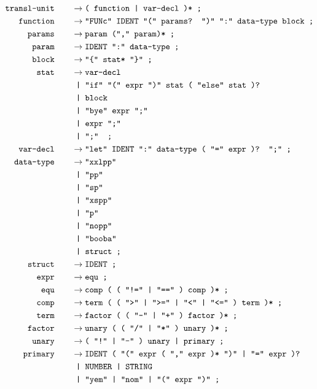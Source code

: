 \documentclass[12pt, a4paper]{article}
\newcommand{\ttt}[1]{
    \text{\texttt{#1}}
}
\newcommand{\ebnfnode}[2]{%
    #1\hspace{20px} &\to #2\ttt{ ;}\\
}
\newcommand{\ebnfnodett}[2]{%
    \ebnfnode{\ttt{#1}}{\ttt{#2}}
}
\begin{document}
    \begin{align*}
        \ebnfnodett{transl-unit}{( function | var-decl )*}
        \ebnfnodett{function}{"FUNc" IDENT "(" params? ")" ":" data-type block}
        \ebnfnodett{params}{param ("," param)*}
        \ebnfnodett{param}{IDENT ":" data-type}
        \ebnfnodett{block}{"\{" stat* "\}"}
        \ebnfnode{\ttt{stat}}
        {%
            \ttt{var-decl}\\
            &\ttt{ | "if" "(" expr ")" stat ( "else" stat )?}\\
            &\ttt{ | block }\\
            &\ttt{ | "bye" expr ";" }\\
            &\ttt{ | expr ";" }\\
            &\ttt{ | ";" }
        }
        \ebnfnodett{var-decl}{"let" IDENT ":" data-type ( "=" expr )? ";"}
        \ebnfnode{\ttt{data-type}}
        {%
            \ttt{"xxlpp"}\\
            &\ttt{ | "pp"}\\
            &\ttt{ | "sp"}\\
            &\ttt{ | "xspp"}\\
            &\ttt{ | "p"}\\
            &\ttt{ | "nopp"}\\
            &\ttt{ | "booba"}\\
            &\ttt{ | struct}
        }
        \ebnfnodett{struct}{IDENT}
        \ebnfnodett{expr}{equ}
        \ebnfnodett{equ}{comp ( ( "!=" | "==" ) comp )*}
        \ebnfnodett{comp}{term ( ( ">" | ">=" | "<" | "<=" ) term )*}
        \ebnfnodett{term}{factor ( ( "-" | "+" ) factor )*}
        \ebnfnodett{factor}{unary ( ( "/" | "*" ) unary )*}
        \ebnfnodett{unary}{( "!" | "-" ) unary | primary}
        \ebnfnode{\ttt{primary}}
        {%
            \ttt{IDENT ( "(" expr ( "," expr )* ")" | "=" expr )?}\\
            &\ttt{ | NUMBER | STRING}\\
            &\ttt{ | "yem" | "nom" | "(" expr ")"}
        }
    \end{align*}
\end{document}

